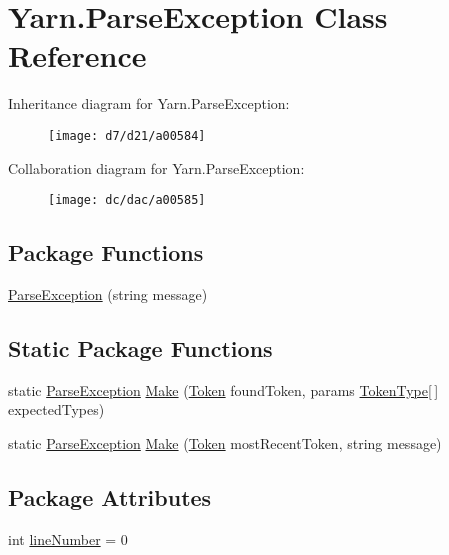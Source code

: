 \hypertarget{a00119}{\section{Yarn.\-Parse\-Exception Class Reference}
\label{a00119}
}


Inheritance diagram for Yarn.\-Parse\-Exception\-:
\nopagebreak
\begin{figure}[H]
\begin{center}
\leavevmode
\texttt{[image: d7/d21/a00584]}
\end{center}
\end{figure}


Collaboration diagram for Yarn.\-Parse\-Exception\-:
\nopagebreak
\begin{figure}[H]
\begin{center}
\leavevmode
\texttt{[image: dc/dac/a00585]}
\end{center}
\end{figure}
\subsection*{Package Functions}
\begin{DoxyCompactItemize}
\item 
\hyperlink{a00119_aa3c4f5c8b0ae86097bbc46044df9f317}{Parse\-Exception} (string message)
\end{DoxyCompactItemize}
\subsection*{Static Package Functions}
\begin{DoxyCompactItemize}
\item 
static \hyperlink{a00119}{Parse\-Exception} \hyperlink{a00119_a511a51bb42dc5bb107eb68f7e5cf5ff1}{Make} (\hyperlink{a00147}{Token} found\-Token, params \hyperlink{a00029_a301aa7c866593a5b625a8fc158bbeace}{Token\-Type}\mbox{[}$\,$\mbox{]} expected\-Types)
\item 
static \hyperlink{a00119}{Parse\-Exception} \hyperlink{a00119_a173f3cabc4741d9d9e016310e90c1c9f}{Make} (\hyperlink{a00147}{Token} most\-Recent\-Token, string message)
\end{DoxyCompactItemize}
\subsection*{Package Attributes}
\begin{DoxyCompactItemize}
\item 
int \hyperlink{a00119_ab335169367e64fd6d89d58b3ac573751}{line\-Number} = 0
\end{DoxyCompactItemize}


